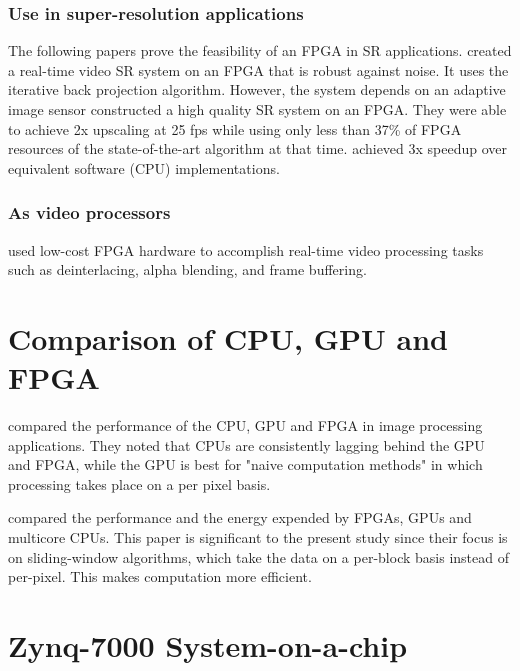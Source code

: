 \subsubsection{Use in super-resolution applications}
The following papers prove the feasibility of an FPGA in SR applications.
\cite{Angelopoulou2009} created a real-time video SR system on an FPGA that is robust against noise.
It uses the iterative back projection algorithm. 
However, the system depends on an adaptive image sensor 
\cite{Szydzik2011} constructed a high quality SR system on an FPGA. 
They were able to achieve 2x upscaling at 25 fps while using only less than 37\% of FPGA resources of the state-of-the-art algorithm at that time.
\cite{Bowen2008} achieved 3x speedup over equivalent software (CPU) implementations.

\subsubsection{As video processors}
\cite{Roth2011} used low-cost FPGA hardware to accomplish real-time video processing tasks such as deinterlacing, alpha blending, and frame buffering.

\section{Comparison of CPU, GPU and FPGA}

\cite{Asano2009} compared the performance of the CPU, GPU and FPGA in image processing applications. 
They noted that CPUs are consistently lagging behind the GPU and FPGA, while the GPU is best for "naive computation methods" in which processing takes place on a per pixel basis.

\cite{Fowers2012} compared the performance and the energy expended by FPGAs, GPUs and multicore CPUs. 
This paper is significant to the present study since their focus is on sliding-window algorithms, which take the data on a per-block basis instead of per-pixel. This makes computation more efficient.

\section{Zynq-7000 System-on-a-chip}

